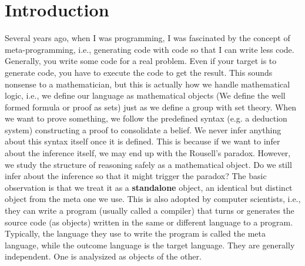 \chapter*{Introduction}

Several years ago, when I was programming, I was fascinated
by the concept of meta-programming, i.e., generating code with code
so that I can write less code. Generally, you write some code for
a real problem. Even if your target is to generate code, you have
to execute the code to get the result. This sounds nonsense to a 
mathematician, but this is actually how we handle mathematical 
logic, i.e., we define our language as mathematical objects 
(We define the well formed formula or proof as sets) 
just as we define a group with set theory. When we want to prove
something, we follow the predefined syntax (e.g. a deduction system)
constructing a proof to consolidate a belief. We never infer anything
about this syntax itself once it is defined. This is because if we
want to infer about the inference itself, we may end up with the 
Rousell's paradox. However, we study the structure of reasoning
safely as a mathematical object. Do we still infer about the inference
so that it might trigger the paradox? The basic observation is that 
we treat it as a {\bf standalone} object, an identical but distinct 
object from the meta one we use. This is also adopted by 
computer scientists, i.e., they can write a program (usually called 
a compiler) that turns or generates the source code (as objects) 
written in the same or different language to a program. Typically, 
the language they use to write the program is called the meta language, 
while the outcome language is the target language. They are generally 
independent. One is analysized as objects of the other. 

